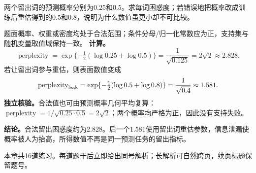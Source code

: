 \begin{example}[留出困惑度]\label{exm:V5-C06-perplexity}
两个留出词的预测概率分别为$0.25$和$0.5$。求每词困惑度；若错误地把概率改成训练后重估得到的$0.5$和$0.8$，说明为什么数值虽更小却不可比较。
\end{example}
\begin{solution}
\SolGiven 题面概率、权重或密度均处于合法范围；条件分母/归一化常数应为正，支持集与随机变量取值域保持一致。
\SolDerive
\textbf{计算。}
\[
\operatorname{perplexity}
=\exp\{-\tfrac12(\log0.25+\log0.5)\}
=\frac1{\sqrt{0.125}}=2\sqrt2\approx2.828.
\]
若让留出词参与重估，则表面数值变成
\[
\operatorname{perplexity}_{\rm leak}
=\exp\{-\tfrac12(\log0.5+\log0.8)\}
=\frac1{\sqrt{0.4}}\approx1.581.
\]
\textbf{独立核验。}合法值也可由预测概率几何平均复算：
$\operatorname{perplexity}=1/\sqrt{0.25\cdot0.5}=2\sqrt2$；两个概率均严格为正，因此没有支持失败。

\textbf{结论。}合法留出困惑度约为$2.828$。后一个$1.581$使用留出词重估参数，信息泄漏使概率被人为抬高，所得数值不再是同一预测任务的留出指标。
\end{solution}

\label{struct:V5-C06-CH33}
\label{struct:V5-C06-CH34}
\begin{chapterexercisebox}
\label{struct:V5-C06-CH35}
本章共16道练习。每道题干后立即给出同号解析；长解析可自然跨页，续页标题保留题号。
\end{chapterexercisebox}

